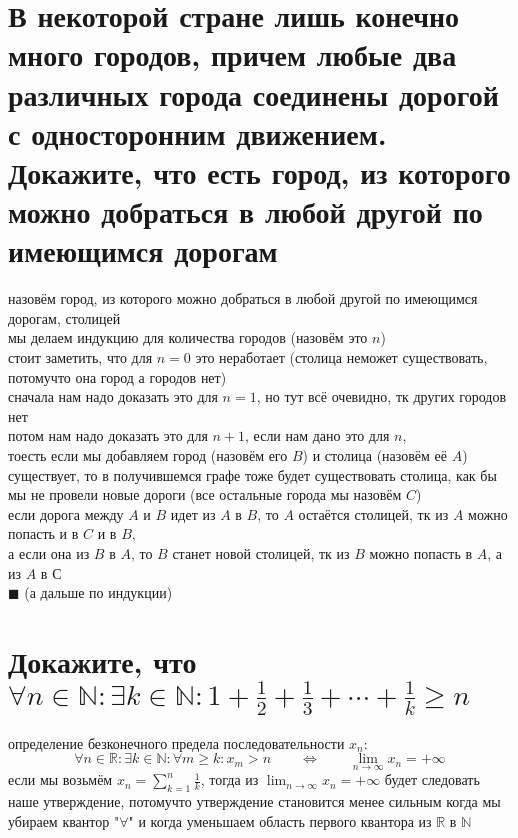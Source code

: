 \documentclass{article}
\newcommand{\ds}{\displaystyle}
\begin{document}
  \section{В некоторой стране лишь конечно много городов, причем любые два различных города соединены дорогой с односторонним движением. Докажите, что есть город, из которого можно добраться в любой другой по имеющимся дорогам}
  назовём город, из которого можно добраться в любой другой по имеющимся дорогам, столицей \\
  мы делаем индукцию для количества городов (назовём это $n$) \\
  стоит заметить, что для $n=0$ это неработает (столица неможет существовать, потомучто она город а городов нет) \\
  сначала нам надо доказать это для $n=1$, но тут всё очевидно, тк других городов нет \\
  потом нам надо доказать это для $n+1$, если нам дано это для $n$, \\
  тоесть если мы добавляем город (назовём его $B$) и столица (назовём её $A$) существует,
  то в получившемся графе тоже будет существовать столица, как бы мы не провели новые дороги (все остальные города мы назовём $C$) \\
  если дорога между $A$ и $B$ идет из $A$ в $B$, то $A$ остаётся столицей, тк из $A$ можно попасть и в $C$ и в $B$, \\
  а если она из $B$ в $A$, то $B$ станет новой столицей, тк из $B$ можно попасть в $A$, а из $A$ в $С$ \\
  $\blacksquare$ (а дальше по индукции)

  \section{Докажите, что $\forall n\in\mathbb{N}:\exists k\in\mathbb{N}: 1+\frac{1}{2}+\frac{1}{3}+\cdots+\frac{1}{k} \geq n$}
  определение безконечного предела последовательности $x_n$:
  \[
    \forall n\in\mathbb{R}:\exists k\in\mathbb{N}:\forall m \geq k: x_m > n
    \qquad\iff\qquad
    \lim_{n \to \infty} x_n = +\infty
  \]
  если мы возьмём $\ds x_n = \sum_{k=1}^n \frac{1}{k}$, тогда из $\ds \lim_{n \to \infty} x_n = +\infty $ будет следовать наше утверждение,
  потомучто утверждение становится менее сильным когда мы убираем квантор "$\forall$"{} и когда уменьшаем область первого квантора из $\mathbb{R}$ в $\mathbb{N}$
\end{document}
